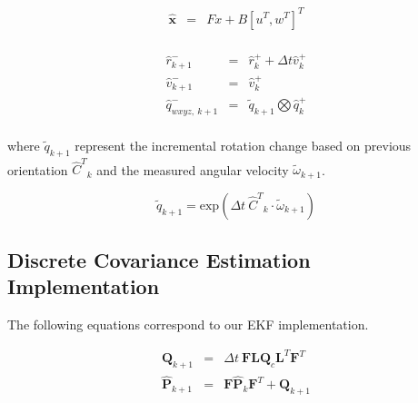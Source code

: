 \documentclass[letterpaper, 10 pt, conference]{ieeeconf}  %
\newcommand{\transpose}[1]{\ensuremath{#1^{\scriptscriptstyle T}}}
\begin{document}
\begin{equation}
\begin{array}{lll}
\hat{\mathbf{x}}  & = & F {x} + {B} \transpose{[\transpose{u}, \transpose{w}]}\\
\end{array}
\end{equation}

\begin{equation}
  \begin{array}{lll}
    \hat{r}_{k+1}^{-} &  = & \hat{r}^{+}_{k} + \Delta t \hat{v}^{+}_{k} \\
    \hat{v}_{k+1}^{-} &  = & \hat{v}^{+}_{k} \\
    \hat{q}_{wxyz,~k+1}^{-} &  = &  \tilde{q}_{k+1} \bigotimes \hat{q}_{k}^{+}\\
  \end{array}
\end{equation}

\noindent
where \(\tilde{q}_{k+1}\) represent the incremental rotation change based on
previous orientation \(\transpose{\hat{C}}_{k}\) and the measured angular
velocity \(\tilde{\omega}_{k+1}\).


\begin{equation}
  \tilde{q}_{k+1} = \text{exp} \left( \Delta t~\transpose{\hat{C}}_{k} \cdot \tilde{\omega}_{k+1} \right)
\end{equation}





\subsection{Discrete Covariance Estimation Implementation}
The following equations correspond to our EKF implementation.

\begin{equation}
  \begin{array}{lll}
  \mathbf{Q}_{k+1} &=& \Delta t~\mathbf{F} \mathbf{L} \mathbf{Q}_{c} \transpose{\mathbf{L}}  \transpose{\mathbf{F}} \\
  \hat{\mathbf{P}}_{k+1} &=& \mathbf{F} \hat{\mathbf{P}}_{k} \transpose{\mathbf{F}}+\mathbf{Q}_{k+1}\\
  \end{array}
\end{equation}
\end{document}
